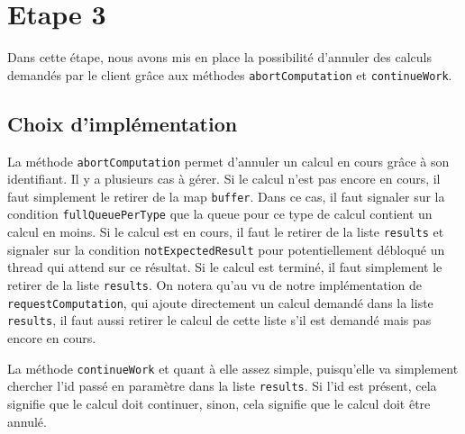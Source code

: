 \documentclass{article}
\begin{document}
\section{Etape 3}
Dans cette étape, nous avons mis en place la possibilité d’annuler des calculs demandés par le client grâce aux méthodes
\texttt{abortComputation} et \texttt{continueWork}.

\subsection{Choix d'implémentation}
La méthode \texttt{abortComputation} permet d’annuler un calcul en cours grâce à son identifiant. Il y a plusieurs
cas à gérer. Si le calcul n’est pas encore en cours, il faut simplement le retirer de la map \texttt{buffer}. Dans
ce cas, il faut signaler sur la condition \texttt{fullQueuePerType} que la queue pour ce type de calcul contient un
calcul en moins. Si le calcul est en cours, il faut le retirer de la liste \texttt{results} et signaler sur
la condition \texttt{notExpectedResult} pour potentiellement débloqué un thread qui attend sur ce résultat.
Si le calcul est terminé, il faut simplement le retirer de la liste \texttt{results}.
On notera qu'au vu de notre implémentation de \texttt{requestComputation}, qui ajoute directement un calcul demandé
dans la liste \texttt{results}, il faut aussi retirer le calcul de cette liste s'il est demandé mais pas encore en
cours.

La méthode \texttt{continueWork} et quant à elle assez simple, puisqu'elle va simplement chercher l'id passé en
paramètre dans la liste \texttt{results}. Si l'id est présent, cela signifie que le calcul doit continuer, sinon, cela
signifie que le calcul doit être annulé.
\end{document}
